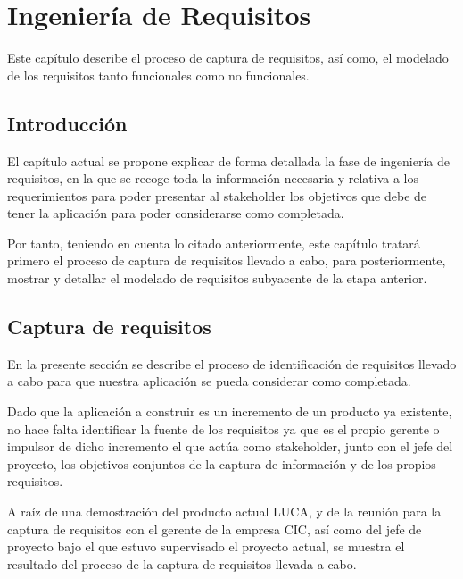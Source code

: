 \chapter{Ingeniería de Requisitos}
	
	Este capítulo describe el proceso de captura de requisitos, así como, el modelado de los requisitos tanto funcionales como no funcionales.
	
	\minitoc
	
	
	
		\section{Introducción}
		
		El capítulo actual se propone explicar de forma detallada la fase de ingeniería de requisitos, en la que se recoge toda la información necesaria y relativa a los requerimientos para poder presentar al stakeholder los objetivos que debe de tener la aplicación para poder considerarse como completada.
		
		\vspace{5mm}
		
		Por tanto, teniendo en cuenta lo citado anteriormente, este capítulo tratará primero el proceso de captura de requisitos llevado a cabo, para posteriormente, mostrar y detallar el modelado de requisitos subyacente de la etapa anterior.
		
		\section{Captura de requisitos}
		
		En la presente sección se describe el proceso de identificación de requisitos llevado a cabo para que nuestra aplicación se pueda considerar como completada. 
		
		\vspace{5mm}
		
		Dado que la aplicación a construir es un incremento de un producto ya existente, no hace falta identificar la fuente de los requisitos ya que es el propio gerente o impulsor de dicho incremento el que actúa como stakeholder, junto con el jefe del proyecto, los objetivos conjuntos de la captura de información y de los propios requisitos.
		
		\vspace{5mm}
		
		A raíz de una demostración del producto actual LUCA, y de la reunión para la captura de requisitos con el gerente de la empresa CIC, así como del jefe de proyecto bajo el que estuvo supervisado el proyecto actual, se muestra el resultado del proceso de la captura de requisitos llevada a cabo. 
		
